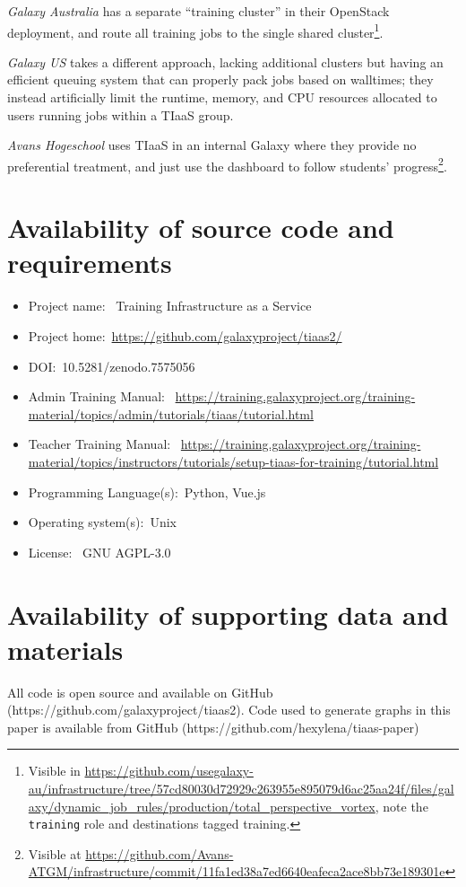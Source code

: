 \documentclass[a4paper,num-refs]{oup-contemporary}
\begin{document}
\emph{Galaxy Australia} has a separate ``training cluster'' in their OpenStack deployment, and route all training jobs to the single shared cluster\footnote{Visible in \url{https://github.com/usegalaxy-au/infrastructure/tree/57cd80030d72929c263955e895079d6ac25aa24f/files/galaxy/dynamic_job_rules/production/total_perspective_vortex}, note the \texttt{training} role and destinations tagged training.}.

\emph{Galaxy US} takes a different approach, lacking additional clusters but having an efficient queuing system that can properly pack jobs based on walltimes; they instead artificially limit the runtime, memory, and CPU resources allocated to users running jobs within a TIaaS group. 

\emph{Avans Hogeschool} uses TIaaS in an internal Galaxy where they provide no preferential treatment, and just use the dashboard to follow students' progress\footnote{Visible at \url{https://github.com/Avans-ATGM/infrastructure/commit/11fa1ed38a7ed6640eafeca2ace8bb73e189301e}}.

\section{Availability of source code and requirements}

\begin{itemize}
\item Project name: ~Training Infrastructure as a Service
\item Project home:~\url{https://github.com/galaxyproject/tiaas2/}
\item DOI:~10.5281/zenodo.7575056
\item Admin Training Manual: ~\url{https://training.galaxyproject.org/training-material/topics/admin/tutorials/tiaas/tutorial.html}
\item Teacher Training Manual: ~\url{https://training.galaxyproject.org/training-material/topics/instructors/tutorials/setup-tiaas-for-training/tutorial.html}
\item Programming Language(s):~Python, Vue.js
\item Operating system(s):~Unix
\item License: ~GNU AGPL-3.0
\end{itemize}

\section{Availability of supporting data and materials}
All code is open source and available on GitHub (https://github.com/galaxyproject/tiaas2). Code used to generate graphs in this paper is available from GitHub (https://github.com/hexylena/tiaas-paper)
\end{document}
